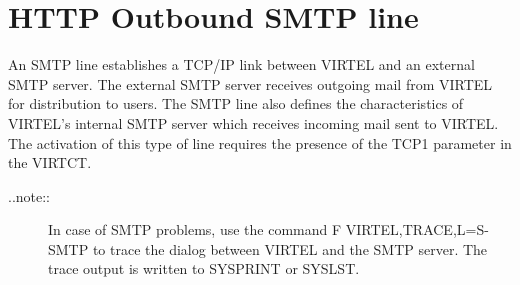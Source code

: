 \documentclass[letterpaper,10pt,english]{sphinxmanual}
\begin{document}
\section{HTTP Outbound SMTP line}
\label{\detokenize{connectivity_guide:index-17}}\label{\detokenize{connectivity_guide:http-outbound-smtp-line}}
An SMTP line establishes a TCP/IP link between VIRTEL and an external SMTP server. The external SMTP server receives outgoing mail from VIRTEL for distribution to users. The SMTP line also defines the characteristics of VIRTEL’s internal SMTP server which receives incoming mail sent to VIRTEL.  The activation of this type of line requires the presence of the TCP1 parameter in the VIRTCT.
\begin{description}
\item[{..note::}] \leavevmode
In case of SMTP problems, use the command F VIRTEL,TRACE,L=S-SMTP to trace the dialog between VIRTEL and the SMTP server. The trace output is written to SYSPRINT or SYSLST.

\end{description}


\end{document}
